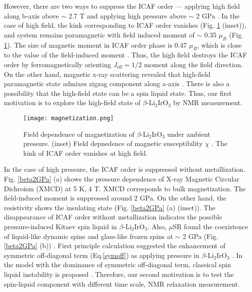 \documentclass[a4,10.5pt]{report}
\begin{document}
However, there are two ways to suppress the ICAF order --- applying high field along b-axis above $\sim$ 2.7 T 
and applying high pressure above $\sim$ 2 GPa \cite{takayama2015hyperhoneycomb}.
In the case of high field, the kink corresponding to ICAF order vanishes (Fig. \ref{Bdep_mag} (inset)), 
and system remains paramagnetic with field induced moment of $\sim$ 0.35 $\mu_B$ (Fig. \ref{Bdep_mag}).
The size of magnetic moment in ICAF order phase is 0.47 $\mu_B$, which is close to the value of the field-induced moment \cite{Biffin2014}.
Thus, the high field destroys the ICAF order by ferromagnetically orienting $J_{\mathrm{eff}} = 1/2$ moment along the field direction.
On the other hand, magnetic x-ray scattering revealed that high-field paramagnetic state admixes zigzag component along a-axis \cite{ruiz2017correlated}. 
There is also a possibility that the high-field state can be a spin liquid state.
Thus, our first motivation is to explore the high-field state of $\beta$-Li$_2$IrO$_3$ by NMR measurement.

\begin{figure}
  \centering
  \texttt{[image: magnetization.png]}
  \caption{Field dependence of magnetization of $\beta$-Li$_2$IrO$_3$ under ambient pressure.
  (inset) Field depnedence of magnetic susceptibility $\chi$ \cite{takayama2015hyperhoneycomb}.
  The kink of ICAF order vanishes at high field.}
  \label{Bdep_mag}
\end{figure}

In the case of high pressure, the ICAF order is suppressed without metallization.
Fig. \ref{beta2GPa} (a) shows the pressure dependence of X-ray Magnetic Circular Dichroism (XMCD) at 5 K, 4 T.
XMCD corresponds to bulk magnetization.
The field-induced moment is suppressed around 2 GPa.
On the other hand, the resistivity shows the insulating state (Fig. \ref{beta2GPa} (a) (inset)).
The disappearance of ICAF order without metallization indicates the possible pressure-induced Kitaev spin liquid in $\beta$-Li$_2$IrO$_3$. 
Also, $\mu$SR found the coexistence of liquid-like dynamic spins and glass-like frozen spins at $\sim$ 2 GPa (Fig. \ref{beta2GPa} (b)) \cite{Majumder2018}.
First principle calculation suggested the enhancement of symmetric off-diagonal term (Eq.\ref{symoff}) as applying pressure in $\beta$-Li$_2$IrO$_3$ \cite{Yadav2018, Kim2016}.
In the model with the dominance of symmetric off-diagonal term, classical spin liquid instability is proposed \cite{Rousochatzakis2017}.
Therefore, our second motivation is to test the spin-liquid component with different time scale, NMR relaxation measurement. 
\end{document}
